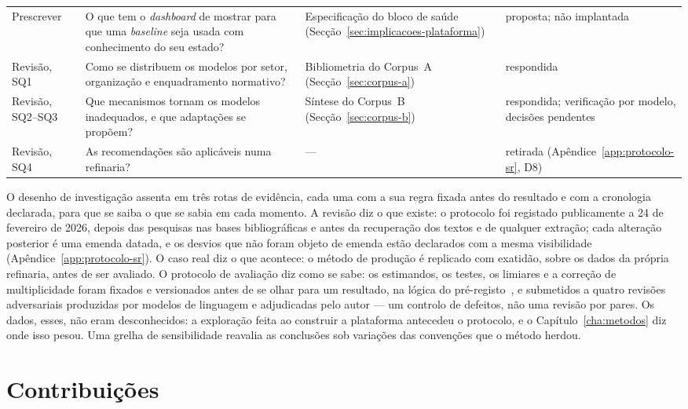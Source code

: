 \begin{table}[htbp]
\begin{tabularx}{\linewidth}{@{}>{\raggedright\arraybackslash}p{1.7cm}>{\raggedright\arraybackslash}X>{\raggedright\arraybackslash}X>{\raggedright\arraybackslash}p{3.1cm}@{}}
    Prescrever & O que tem o \emph{dashboard} de mostrar para que uma \emph{baseline} seja usada com conhecimento do seu estado? & Especificação do bloco de saúde (Secção~\ref{sec:implicacoes-plataforma}) & proposta; não implantada \\
    \addlinespace
    Revisão, SQ1 & Como se distribuem os modelos por setor, organização e enquadramento normativo? & Bibliometria do Corpus~A (Secção~\ref{sec:corpus-a}) & respondida \\
    Revisão, SQ2--SQ3 & Que mecanismos tornam os modelos inadequados, e que adaptações se propõem? & Síntese do Corpus~B (Secção~\ref{sec:corpus-b}) & respondida; verificação por modelo, decisões pendentes \\
    Revisão, SQ4 & As recomendações são aplicáveis numa refinaria? & --- & retirada (Apêndice~\ref{app:protocolo-sr}, D8) \\
    \bottomrule
  \end{tabularx}
\end{table}

O desenho de investigação assenta em três rotas de evidência, cada uma
com a sua regra fixada antes do resultado e com a cronologia declarada,
para que se saiba o que se sabia em cada momento. A revisão diz o que
existe: o protocolo foi registado publicamente a 24 de fevereiro de 2026,
depois das pesquisas nas bases bibliográficas e antes da recuperação dos
textos e de qualquer extração; cada alteração posterior é uma emenda
datada, e os desvios que não foram objeto de emenda estão declarados com
a mesma visibilidade (Apêndice~\ref{app:protocolo-sr}). O caso real diz o
que acontece: o método de produção é replicado com exatidão, sobre os
dados da própria refinaria, antes de ser avaliado. O protocolo de
avaliação diz como se sabe: os estimandos, os testes, os limiares e a
correção de multiplicidade foram fixados e versionados antes de se olhar
para um resultado, na lógica do pré-registo~\cite{Nosek2018}, e
submetidos a quatro revisões adversariais produzidas por modelos de
linguagem e adjudicadas pelo autor --- um controlo de defeitos, não uma
revisão por pares. Os dados, esses, não eram desconhecidos: a exploração
feita ao construir a plataforma antecedeu o protocolo, e o
Capítulo~\ref{cha:metodos} diz onde isso pesou. Uma grelha de
sensibilidade reavalia as conclusões sob variações das convenções que o
método herdou.

\section{Contribuições}
\label{sec:contribuicoes}


